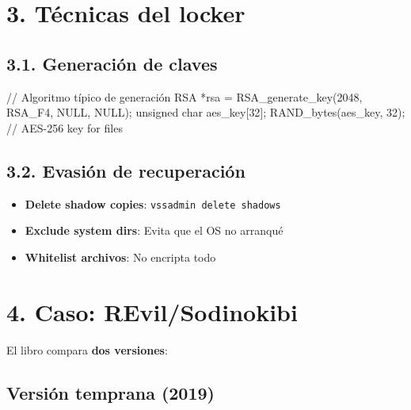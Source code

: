 \documentclass[
  letterpaper,
]{report}
\newenvironment{Shaded}{\begin{snugshade}}{\end{snugshade}}
\newcommand{\CommentTok}[1]{\textcolor[rgb]{0.37,0.37,0.37}{#1}}
\newcommand{\DataTypeTok}[1]{\textcolor[rgb]{0.68,0.00,0.00}{#1}}
\newcommand{\DecValTok}[1]{\textcolor[rgb]{0.68,0.00,0.00}{#1}}
\newcommand{\NormalTok}[1]{\textcolor[rgb]{0.00,0.23,0.31}{#1}}
\newcommand{\OperatorTok}[1]{\textcolor[rgb]{0.37,0.37,0.37}{#1}}
\providecommand{\tightlist}{%
  \setlength{\itemsep}{0pt}\setlength{\parskip}{0pt}}
\begin{document}
\section{3. Técnicas del locker}\label{tuxe9cnicas-del-locker}

\subsection{3.1. Generación de claves}\label{generaciuxf3n-de-claves}

\begin{Shaded}
\begin{Highlighting}[]
\CommentTok{// Algoritmo típico de generación}
\NormalTok{RSA }\OperatorTok{*}\NormalTok{rsa }\OperatorTok{=}\NormalTok{ RSA\_generate\_key}\OperatorTok{(}\DecValTok{2048}\OperatorTok{,}\NormalTok{ RSA\_F4}\OperatorTok{,}\NormalTok{ NULL}\OperatorTok{,}\NormalTok{ NULL}\OperatorTok{);}
\DataTypeTok{unsigned} \DataTypeTok{char}\NormalTok{ aes\_key}\OperatorTok{[}\DecValTok{32}\OperatorTok{];}
\NormalTok{RAND\_bytes}\OperatorTok{(}\NormalTok{aes\_key}\OperatorTok{,} \DecValTok{32}\OperatorTok{);}  \CommentTok{// AES{-}256 key for files}
\end{Highlighting}
\end{Shaded}

\subsection{3.2. Evasión de
recuperación}\label{evasiuxf3n-de-recuperaciuxf3n}

\begin{itemize}
\tightlist
\item
  \textbf{Delete shadow copies}: \texttt{vssadmin\ delete\ shadows}
\item
  \textbf{Exclude system dirs}: Evita que el OS no arranqué
\item
  \textbf{Whitelist archivos}: No encripta todo
\end{itemize}

\section{4. Caso: REvil/Sodinokibi}\label{caso-revilsodinokibi}

El libro compara \textbf{dos versiones}:

\subsection{Versión temprana (2019)}\label{versiuxf3n-temprana-2019}
\end{document}

